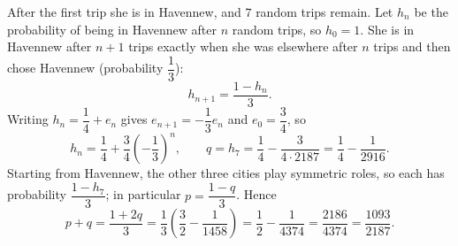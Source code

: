 After the first trip she is in Havennew, and $7$ random trips remain. Let $h_n$ be the probability of being in Havennew after $n$ random trips, so $h_0=1$. She is in Havennew after $n+1$ trips exactly when she was elsewhere after $n$ trips and then chose Havennew (probability $\dfrac{1}{3}$):
\[
h_{n+1}=\dfrac{1-h_n}{3}.
\]
Writing $h_n=\dfrac{1}{4}+e_n$ gives $e_{n+1}=-\dfrac{1}{3}e_n$ and $e_0=\dfrac{3}{4}$, so
\[
h_n=\dfrac{1}{4}+\dfrac{3}{4}\left(-\dfrac{1}{3}\right)^n,\qquad q=h_7=\dfrac{1}{4}-\dfrac{3}{4\cdot 2187}=\dfrac{1}{4}-\dfrac{1}{2916}.
\]
Starting from Havennew, the other three cities play symmetric roles, so each has probability $\dfrac{1-h_7}{3}$; in particular $p=\dfrac{1-q}{3}$. Hence
\[
p+q=\dfrac{1+2q}{3}=\dfrac{1}{3}\left(\dfrac{3}{2}-\dfrac{1}{1458}\right)=\dfrac{1}{2}-\dfrac{1}{4374}=\dfrac{2186}{4374}=\boxed{\dfrac{1093}{2187}}.
\]
